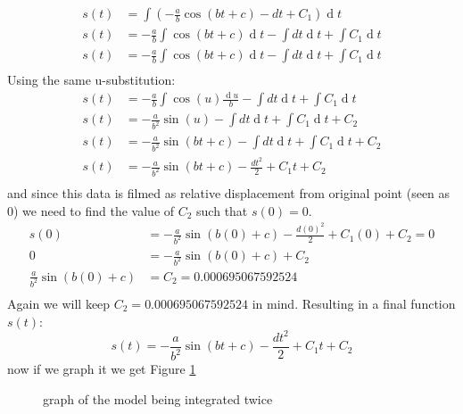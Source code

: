 \documentclass[12pt]{article}
\newcommand{\diff}{\ensuremath{\operatorname{d}\!}}
\begin{document}
\begin{align}
    s(t) &= \int \left(-\frac{a}{b}\cos(bt+c) - dt + C_{1}\right) \diff t \\
    s(t) &= -\frac{a}{b} \int\cos(bt+c)\diff t - \int dt\diff t + \int C_{1}\diff t \\
    s(t) &= -\frac{a}{b} \int\cos(bt+c)\diff t - \int dt\diff t + \int C_{1}\diff t \\
\end{align}
Using the same u-substitution:
\begin{align}
    s(t) &= -\frac{a}{b} \int\cos(u)\frac{\diff u}{b} - \int dt\diff t + \int C_{1}\diff t \\
    s(t) &= -\frac{a}{b^{2}} \sin(u) - \int dt\diff t + \int C_{1}\diff t + C_{2} \\
    s(t) &= -\frac{a}{b^{2}} \sin(bt+c) - \int dt\diff t + \int C_{1}\diff t + C_{2} \\
    s(t) &= -\frac{a}{b^{2}} \sin(bt+c) - \frac{dt^{2}}{2} + C_{1}t + C_{2} \\
\end{align}
and since this data is filmed as relative displacement from original point (seen as 0) we need to find the value of $C_{2}$ such that $s(0)=0$.
\begin{align}
    s(0) &= -\frac{a}{b^{2}} \sin(b\left(0\right)+c) - \frac{d\left(0\right)^{2}}{2} + C_{1}\left(0\right) + C_{2} = 0 \\
    0 &= -\frac{a}{b^{2}} \sin(b\left(0\right)+c) + C_{2} \\
    \frac{a}{b^{2}} \sin(b\left(0\right)+c) &= C_{2} = 0.000695067592524 \\
\end{align}
Again we will keep $C_{2}=0.000695067592524 $ in mind.
Resulting in a final function $s(t)$:
\begin{equation}
    s(t) = -\frac{a}{b^{2}} \sin(bt+c) - \frac{dt^{2}}{2} + C_{1}t + C_{2}
\end{equation}
now if we graph it we get Figure \ref{fig:model representation}
\begin{figure}[H]
    \center
    \caption{graph of the model being integrated twice}
    \label{fig:model representation}
\end{figure}
\end{document}
